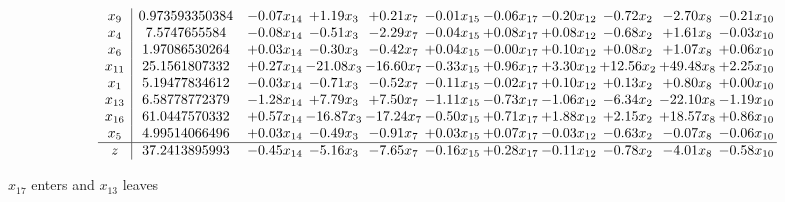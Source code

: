 \documentclass[9pt]{article}
\begin{document}
 \[\begin{array}{c| c c@{\hskip 2pt} c@{\hskip 2pt} c@{\hskip 2pt} c@{\hskip 2pt} c@{\hskip 2pt} c@{\hskip 2pt} c@{\hskip 2pt} c@{\hskip 2pt} c@{\hskip 2pt} }
 x_{9}   &  0.973593350384 & -0.07 x_{14} & +  1.19 x_{3} & +  0.21 x_{7} & -0.01 x_{15} & -0.06 x_{17} & -0.20 x_{12} & -0.72 x_{2} & -2.70 x_{8} & -0.21 x_{10}\\
 x_{4}   &  7.5747655584 & -0.08 x_{14} & -0.51 x_{3} & -2.29 x_{7} & -0.04 x_{15} & +  0.08 x_{17} & +  0.08 x_{12} & -0.68 x_{2} & +  1.61 x_{8} & -0.03 x_{10}\\
 x_{6}   &  1.97086530264 & +  0.03 x_{14} & -0.30 x_{3} & -0.42 x_{7} & +  0.04 x_{15} & -0.00 x_{17} & +  0.10 x_{12} & +  0.08 x_{2} & +  1.07 x_{8} & +  0.06 x_{10}\\
 x_{11}   &  25.1561807332 & +  0.27 x_{14} & -21.08 x_{3} & -16.60 x_{7} & -0.33 x_{15} & +  0.96 x_{17} & +  3.30 x_{12} & + 12.56 x_{2} & + 49.48 x_{8} & +  2.25 x_{10}\\
 x_{1}   &  5.19477834612 & -0.03 x_{14} & -0.71 x_{3} & -0.52 x_{7} & -0.11 x_{15} & -0.02 x_{17} & +  0.10 x_{12} & +  0.13 x_{2} & +  0.80 x_{8} & +  0.00 x_{10}\\
 x_{13}   &  6.58778772379 & -1.28 x_{14} & +  7.79 x_{3} & +  7.50 x_{7} & -1.11 x_{15} & -0.73 x_{17} & -1.06 x_{12} & -6.34 x_{2} & -22.10 x_{8} & -1.19 x_{10}\\
 x_{16}   &  61.0447570332 & +  0.57 x_{14} & -16.87 x_{3} & -17.24 x_{7} & -0.50 x_{15} & +  0.71 x_{17} & +  1.88 x_{12} & +  2.15 x_{2} & + 18.57 x_{8} & +  0.86 x_{10}\\
 x_{5}   &  4.99514066496 & +  0.03 x_{14} & -0.49 x_{3} & -0.91 x_{7} & +  0.03 x_{15} & +  0.07 x_{17} & -0.03 x_{12} & -0.63 x_{2} & -0.07 x_{8} & -0.06 x_{10}\\
\hline
z    &  37.2413895993 & -0.45 x_{14} & -5.16 x_{3} & -7.65 x_{7} & -0.16 x_{15} & +  0.28 x_{17} & -0.11 x_{12} & -0.78 x_{2} & -4.01 x_{8} & -0.58 x_{10}\\
\end{array}\]


 $ x_{17} $ enters and $ x_{13} $ leaves 
\end{document}
